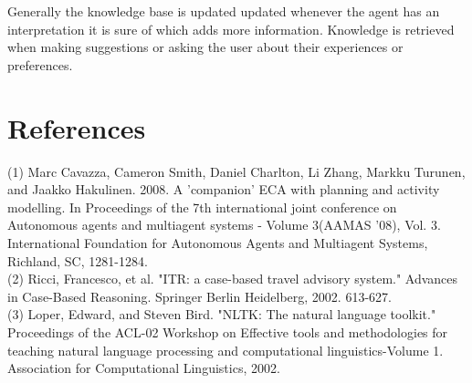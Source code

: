 \documentclass[11pt]{article} %
\begin{document}
\\
\\
Generally the knowledge base is updated updated whenever the agent has an interpretation it is sure of which adds more information. Knowledge is retrieved when making suggestions or asking the user about their experiences or preferences.
\section{References}
(1) Marc Cavazza, Cameron Smith, Daniel Charlton, Li Zhang, Markku Turunen, and Jaakko Hakulinen. 2008. A 'companion' ECA with planning and activity modelling. In Proceedings of the 7th international joint conference on Autonomous agents and multiagent systems - Volume 3(AAMAS '08), Vol. 3. International Foundation for Autonomous Agents and Multiagent Systems, Richland, SC, 1281-1284.\\
(2) Ricci, Francesco, et al. "ITR: a case-based travel advisory system." Advances in Case-Based Reasoning. Springer Berlin Heidelberg, 2002. 613-627.\\
(3) Loper, Edward, and Steven Bird. "NLTK: The natural language toolkit." Proceedings of the ACL-02 Workshop on Effective tools and methodologies for teaching natural language processing and computational linguistics-Volume 1. Association for Computational Linguistics, 2002.
\end{document}
